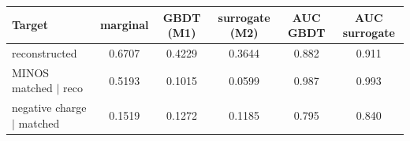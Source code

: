 \begin{tabular}{lccccc}
\toprule
Target & marginal & GBDT (M1) & surrogate (M2) & AUC GBDT & AUC surrogate \\
\midrule
reconstructed & 0.6707 & 0.4229 & 0.3644 & 0.882 & 0.911 \\
MINOS matched $\mid$ reco & 0.5193 & 0.1015 & 0.0599 & 0.987 & 0.993 \\
negative charge $\mid$ matched & 0.1519 & 0.1272 & 0.1185 & 0.795 & 0.840 \\
\bottomrule
\end{tabular}
